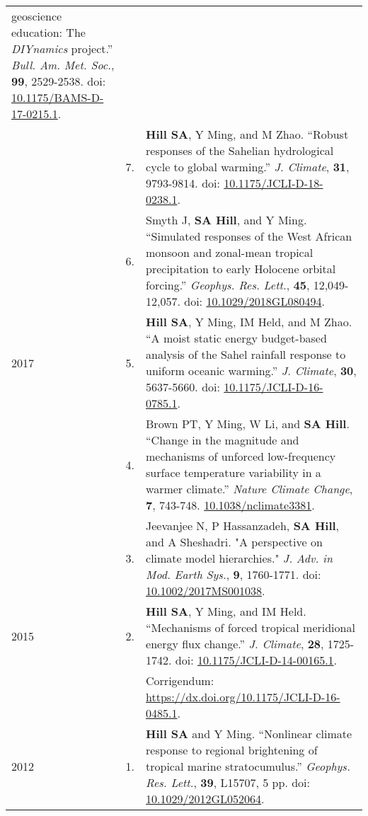 \documentclass[letterpaper,11pt]{shillcv}
\begin{document}
\begin{longtable}{@{} Y{0.05\textwidth} >{\color{black}} p{0.04\textwidth} @{} L{0.91\textwidth} @{}}
geoscience education: The \emph{DIYnamics} project.''  \emph{Bull.
Am. Met. Soc.}, \textbf{99}, 2529-2538.  doi: \href{https://doi.org/10.1175/BAMS-D-17-0215.1}{10.1175/BAMS-D-17-0215.1}.\\
     & 7. & \textbf{Hill SA}, Y Ming, and M Zhao.  ``Robust responses of the
Sahelian hydrological cycle to global warming.''  \emph{J. Climate}, \textbf{31}, 9793-9814.  doi: \href{https://doi.org/10.1175/JCLI-D-18-0238.1}{10.1175/JCLI-D-18-0238.1}.\\
     & 6. & Smyth J, \textbf{SA Hill}, and Y Ming.  ``Simulated responses of
the West African monsoon and zonal-mean tropical precipitation to early
Holocene orbital forcing.''  \emph{Geophys. Res. Lett.}, \textbf{45},
12,049-12,057.  doi: \href{https://doi.org/10.1029/2018GL080494}{10.1029/2018GL080494}.\\
2017 & 5. & \textbf{Hill SA}, Y Ming, IM Held, and M Zhao.  ``A moist
static energy budget-based analysis of the Sahel rainfall response to uniform
oceanic warming.''  \emph{J. Climate}, \textbf{30}, 5637-5660.  doi: \href{https://doi.org/10.1175/JCLI-D-16-0785.1}{10.1175/JCLI-D-16-0785.1}.\\
     & 4. & Brown PT, Y Ming, W Li, and \textbf{SA Hill}.  ``Change
in the magnitude and mechanisms of unforced low-frequency surface temperature
variability in a warmer climate.''  \emph{Nature Climate Change}, \textbf{7}, 743-748.  \href{https://doi.org/10.1038/nclimate3381}{10.1038/nclimate3381}.\\
     & 3. & Jeevanjee N, P Hassanzadeh, \textbf{SA Hill}, and A Sheshadri.  "A perspective on climate model hierarchies."  \emph{J.  Adv. in Mod. Earth Sys.}, \textbf{9}, 1760-1771.  doi: \href{https://doi.org/10.1002/2017MS001038}{10.1002/2017MS001038}.\\
2015 & 2. & \textbf{Hill SA}, Y Ming, and IM Held.  ``Mechanisms of forced
tropical meridional energy flux change.''  \emph{J. Climate}, \textbf{28}, 1725-1742.  doi: \href{http://dx.doi.org/10.1175/JCLI-D-14-00165.1}{10.1175/JCLI-D-14-00165.1}.\\
& & \hspace{1cm} Corrigendum: \href{https://dx.doi.org/10.1175/JCLI-D-16-0485.1}{https://dx.doi.org/10.1175/JCLI-D-16-0485.1}.\\
2012 & 1. & \textbf{Hill SA} and Y Ming.  ``Nonlinear climate response to regional
brightening of tropical marine stratocumulus.''  \emph{Geophys. Res. Lett.},
\textbf{39}, L15707, 5 pp.  doi: \href{http://dx.doi.org/10.1029/2012GL052064}{10.1029/2012GL052064}.\\
\end{longtable}
\end{document}
